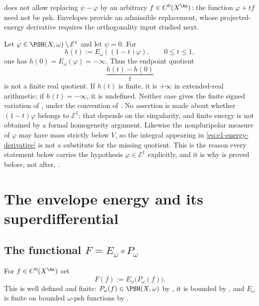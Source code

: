 \begin{remark}
\label{rem:ch27-no-arbitrary-direction}
 does not allow replacing
$\psi-\varphi$ by an arbitrary $f\in C^0(X^{\An})$: the function
$\varphi+tf$ need not be psh. Envelopes provide an admissible replacement, whose projected-energy
derivative requires the orthogonality input studied next.
\end{remark}

\begin{example}
\label{ex:ch27-outside-e1}
Let $\varphi\in\PSH(X,\omega)\setminus\mathcal E^1$ and let $\psi=0$.
For
\[
                 h(t):=E_\omega((1-t)\varphi),\qquad0\leq t\leq1,
\]
one has $h(0)=E_\omega(\varphi)=-\infty$.  Thus the endpoint quotient
\[
                    \frac{h(t)-h(0)}{t}
\]
is not a finite real quotient.  If $h(t)$ is finite, it is $+\infty$
in extended-real arithmetic; if $h(t)=-\infty$, it is undefined.
Neither case gives the finite signed variation of
, under the convention of
.  No assertion is made about whether
$(1-t)\varphi$ belongs to $\mathcal E^1$; that depends on the
singularity, and finite energy is not obtained by a formal homogeneity
argument.  Likewise the nonpluripolar measure of $\varphi$ may have mass
strictly below $V$, so the integral appearing in
\eqref{eq:e1-energy-derivative} is not a substitute for the missing
quotient.  This is the reason every statement below carries the hypothesis
$\varphi\in\mathcal E^1$ explicitly, and it is why
 is proved before, not after,
.
\end{example}

\section{The envelope energy and its superdifferential}
\label{sec:ch27-superdifferential}

\subsection{The functional \texorpdfstring{$F=E_\omega\circ P_\omega$}{F}}
\label{sec:ch27-F-elementary}

\begin{definition}
\label{def:ch27-envelope-energy}
For $f\in C^0(X^{\An})$ set
\begin{equation}\label{eq:ch27-F-definition}
 F(f):=E_\omega\bigl(P_\omega(f)\bigr).
\end{equation}
This is well defined and finite: $P_\omega(f)\in\PSH(X,\omega)$ by
, it is bounded by
, and $E_\omega$ is finite on bounded
$\omega$-psh functions by .
\end{definition}

